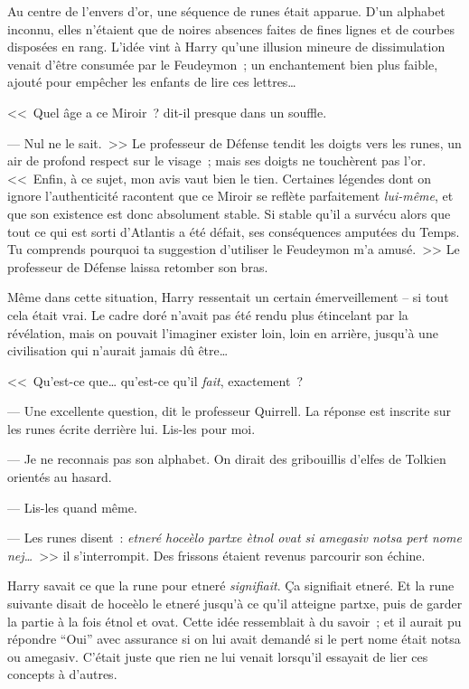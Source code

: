 Au centre de l'envers d'or, une séquence de runes était apparue. D'un alphabet inconnu, elles n'étaient que de noires absences faites de fines lignes et de courbes disposées en rang. L'idée vint à Harry qu'une illusion mineure de dissimulation venait d'être consumée par le Feudeymon~; un enchantement bien plus faible, ajouté pour empêcher les enfants de lire ces lettres…

<<~Quel âge a ce Miroir~? dit-il presque dans un souffle.

--- Nul ne le sait.~>> Le professeur de Défense tendit les doigts vers les runes, un air de profond respect sur le visage~; mais ses doigts ne touchèrent pas l'or. <<~Enfin, à ce sujet, mon avis vaut bien le tien. Certaines légendes dont on ignore l'authenticité racontent que ce Miroir se reflète parfaitement \emph{lui-même}, et que son existence est donc absolument stable. Si stable qu'il a survécu alors que tout ce qui est sorti d'Atlantis a été défait, ses conséquences amputées du Temps. Tu comprends pourquoi ta suggestion d'utiliser le Feudeymon m'a amusé.~>> Le professeur de Défense laissa retomber son bras.

Même dans cette situation, Harry ressentait un certain émerveillement -- si tout cela était vrai. Le cadre doré n'avait pas été rendu plus étincelant par la révélation, mais on pouvait l'imaginer exister loin, loin en arrière, jusqu'à une civilisation qui n'aurait jamais dû être…

<<~Qu'est-ce que… qu'est-ce qu'il \emph{fait}, exactement~?

--- Une excellente question, dit le professeur Quirrell. La réponse est inscrite sur les runes écrite derrière lui. Lis-les pour moi.

--- Je ne reconnais pas son alphabet. On dirait des gribouillis d'elfes de Tolkien orientés au hasard.

--- Lis-les quand même. 

--- Les runes disent~: \emph{etneré hoceèlo partxe ètnol ovat si amegasiv notsa pert nome nej…}~>> il s'interrompit. Des frissons étaient revenus parcourir son échine.

Harry savait ce que la rune pour etneré \emph{signifiait}. Ça signifiait etneré. Et la rune suivante disait de hoceèlo le etneré jusqu'à ce qu'il atteigne partxe, puis de garder la partie à la fois étnol et ovat. Cette idée ressemblait à du savoir~; et il aurait pu répondre “Oui” avec assurance si on lui avait demandé si le pert nome était notsa ou amegasiv. C'était juste que rien ne lui venait lorsqu'il essayait de lier ces concepts à d'autres.

